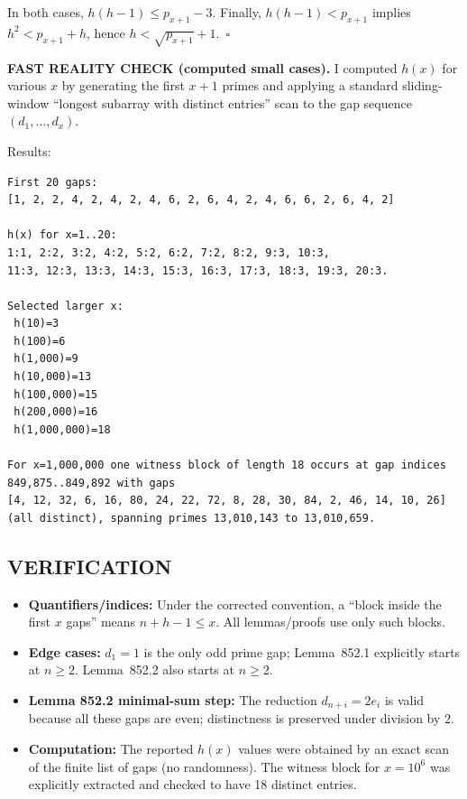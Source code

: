 In both cases, $h(h-1)\le p_{x+1}-3$. Finally, $h(h-1)<p_{x+1}$ implies $h^2<p_{x+1}+h$, hence $h<\sqrt{p_{x+1}}+1$.\ $\square$


\medskip
\textbf{FAST REALITY CHECK (computed small cases).}
I computed $h(x)$ for various $x$ by generating the first $x+1$ primes and applying a standard sliding-window ``longest subarray with distinct entries'' scan to the gap sequence $(d_1,\dots,d_x)$.

Results:
\begin{verbatim}
First 20 gaps:
[1, 2, 2, 4, 2, 4, 2, 4, 6, 2, 6, 4, 2, 4, 6, 6, 2, 6, 4, 2]

h(x) for x=1..20:
1:1, 2:2, 3:2, 4:2, 5:2, 6:2, 7:2, 8:2, 9:3, 10:3,
11:3, 12:3, 13:3, 14:3, 15:3, 16:3, 17:3, 18:3, 19:3, 20:3.

Selected larger x:
 h(10)=3
 h(100)=6
 h(1,000)=9
 h(10,000)=13
 h(100,000)=15
 h(200,000)=16
 h(1,000,000)=18

For x=1,000,000 one witness block of length 18 occurs at gap indices
849,875..849,892 with gaps
[4, 12, 32, 6, 16, 80, 24, 22, 72, 8, 28, 30, 84, 2, 46, 14, 10, 26]
(all distinct), spanning primes 13,010,143 to 13,010,659.
\end{verbatim}

\subsection*{VERIFICATION}
\begin{itemize}
\item \textbf{Quantifiers/indices:} Under the corrected convention, a ``block inside the first $x$ gaps'' means $n+h-1\le x$. All lemmas/proofs use only such blocks.
\item \textbf{Edge cases:} $d_1=1$ is the only odd prime gap; Lemma~852.1 explicitly starts at $n\ge 2$. Lemma~852.2 also starts at $n\ge 2$.
\item \textbf{Lemma 852.2 minimal-sum step:} The reduction $d_{n+i}=2e_i$ is valid because all these gaps are even; distinctness is preserved under division by $2$.
\item \textbf{Computation:} The reported $h(x)$ values were obtained by an exact scan of the finite list of gaps (no randomness). The witness block for $x=10^6$ was explicitly extracted and checked to have 18 distinct entries.
\end{itemize}

